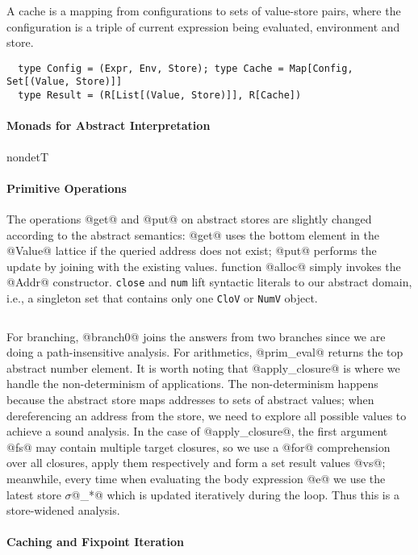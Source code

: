 A cache is a mapping from configurations to sets of value-store pairs, where the
configuration is a triple of current expression being evaluated, environment and store.

\begin{lstlisting}
  type Config = (Expr, Env, Store); type Cache = Map[Config, Set[(Value, Store)]]
  type Result = (R[List[(Value, Store)]], R[Cache])
\end{lstlisting}

\paragraph{Monads for Abstract Interpretation} nondetT

\paragraph{Primitive Operations}

The operations @get@ and @put@ on abstract stores are slightly changed according
to the abstract semantics: @get@ uses the bottom element in the @Value@ lattice
if the queried address does not exist; @put@ performs the update by joining with
the existing values. function @alloc@ simply invokes the @Addr@ constructor.
\texttt{close} and \texttt{num} lift syntactic literals to our abstract domain,
i.e., a singleton set that contains only one \texttt{CloV} or \texttt{NumV}
object.

\begin{lstlisting}
\end{lstlisting}

For branching, @branch0@ joins the answers from two branches since we are doing
a path-insensitive analysis. For arithmetics, @prim_eval@ returns the top
abstract number element. It is worth noting that @apply_closure@ is where we
handle the non-determinism of applications. The non-determinism happens because
the abstract store maps addresses to sets of abstract values; when dereferencing
an address from the store, we need to explore all possible values to achieve a
sound analysis. In the case of @apply_closure@, the first argument @fs@ may
contain multiple target closures, so we use a @for@ comprehension over all
closures, apply them respectively and form a set result values @vs@; meanwhile,
every time when evaluating the body expression @e@ we use the latest store
$\sigma$@_*@ which is updated iteratively during the loop. Thus this is a
store-widened analysis.

\paragraph{Caching and Fixpoint Iteration}

